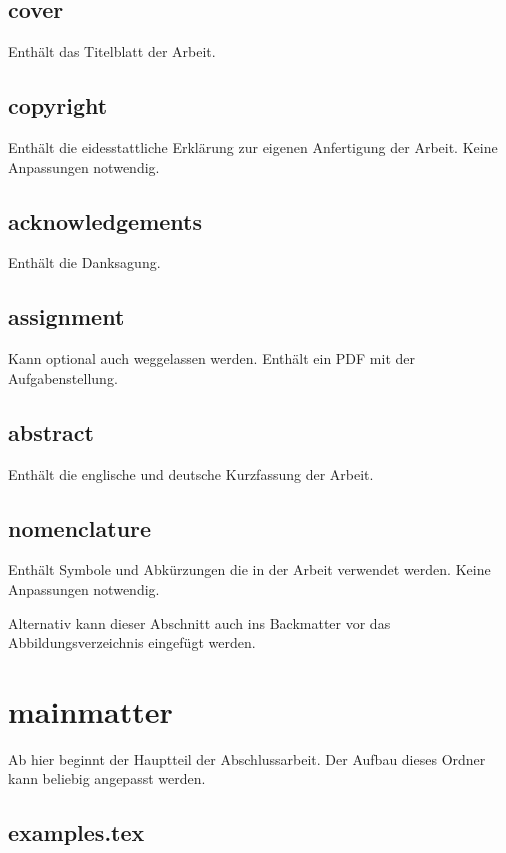 \subsection*{cover}

Enthält das Titelblatt der Arbeit. 

\subsection*{copyright}

Enthält die eidesstattliche Erklärung zur eigenen Anfertigung der Arbeit. Keine Anpassungen notwendig.

\subsection*{acknowledgements}

Enthält die Danksagung. 

\subsection*{assignment}

Kann optional auch weggelassen werden. Enthält ein PDF mit der Aufgabenstellung.

\subsection*{abstract}

Enthält die englische und deutsche Kurzfassung der Arbeit.

\subsection*{nomenclature}

Enthält Symbole und Abkürzungen die in der Arbeit verwendet werden. Keine Anpassungen notwendig.

Alternativ kann dieser Abschnitt auch ins Backmatter vor das Abbildungsverzeichnis eingefügt werden.

\section*{mainmatter}
\label{section:_A_mainmatter}

Ab hier beginnt der Hauptteil der Abschlussarbeit. Der Aufbau dieses Ordner kann beliebig angepasst werden.

\subsection*{examples.tex}

